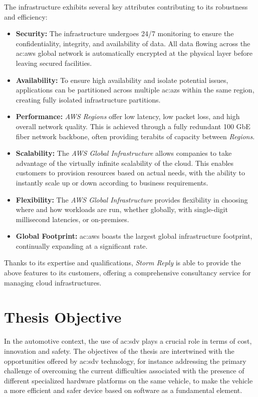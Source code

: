 The infrastructure exhibits several key attributes contributing to its robustness and efficiency: 
\begin{itemize} 
  \item \textbf{Security:} The infrastructure undergoes 24/7 monitoring to ensure the confidentiality, integrity, and availability of data. All data flowing across the \gls{ac:aws} global network is automatically encrypted at the physical layer before leaving secured facilities.
  \item \textbf{Availability:} To ensure high availability and isolate potential issues, applications can be partitioned across multiple \gls{ac:az}s within the same region, creating fully isolated infrastructure partitions.
  \item \textbf{Performance:} \textit{AWS Regions} offer low latency, low packet loss, and high overall network quality. This is achieved through a fully redundant 100 GbE fiber network backbone, often providing terabits of capacity between \textit{Regions}.
  \item \textbf{Scalability:} The \textit{AWS Global Infrastructure} allows companies to take advantage of the virtually infinite scalability of the cloud. This enables customers to provision resources based on actual needs, with the ability to instantly scale up or down according to business requirements.
  \item \textbf{Flexibility:} The \textit{AWS Global Infrastructure} provides flexibility in choosing where and how workloads are run, whether globally, with single-digit millisecond latencies, or on-premises.
  \item \textbf{Global Footprint:} \gls{ac:aws} boasts the largest global infrastructure footprint, continually expanding at a significant rate.
\end{itemize}
Thanks to its expertise and qualifications, \textit{Storm Reply} is able to provide the above features to its customers, offering a comprehensive consultancy service for managing cloud infrastructures.

\section{Thesis Objective}
In the automotive context, the use of \gls{ac:sdv} plays a crucial role in terms of cost, innovation and safety. The objectives of the thesis are intertwined with the opportunities offered by \gls{ac:sdv} technology, for instance addressing the primary challenge of overcoming the current difficulties associated with the presence of different specialized hardware platforms on the same vehicle, to make the vehicle a more efficient and safer device based on software as a fundamental element.


